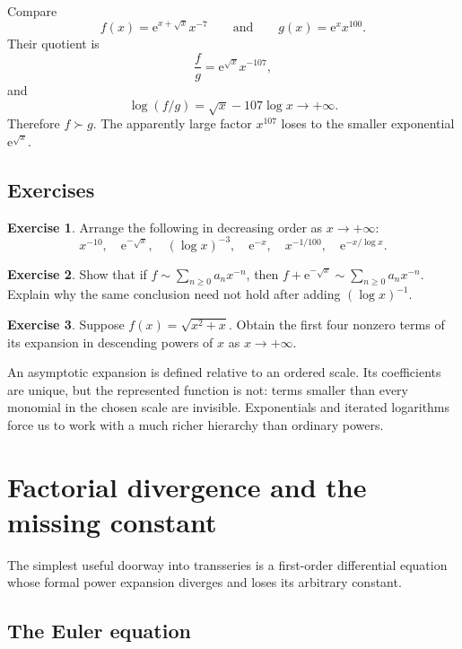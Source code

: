 \documentclass[11pt,openany]{book}
\theoremstyle{definition}
\newtheorem{exercise}{Exercise}[chapter]
\theoremstyle{plain}
\theoremstyle{remark}
\newcommand{\e}{\mathrm{e}}
\newcommand{\asym}{\sim}
\newcommand{\succdom}{\succ}
\begin{document}
\begin{workedbox}
Compare
\[
 f(x)=\e^{x+\sqrt{x}}x^{-7}
 \qquad\text{and}\qquad
 g(x)=\e^x x^{100}.
\]
Their quotient is
\[
 \frac fg=\e^{\sqrt{x}}x^{-107},
\]
and
\[
 \log(f/g)=\sqrt{x}-107\log x\longrightarrow+\infty.
\]
Therefore $f\succdom g$. The apparently large factor $x^{107}$ loses to the smaller exponential $\e^{\sqrt{x}}$.
\end{workedbox}

\section{Exercises}

\begin{exercise}
Arrange the following in decreasing order as $x\to+\infty$:
\[
 x^{-10},\quad \e^{-\sqrt{x}},\quad (\log x)^{-3},\quad
 \e^{-x},\quad x^{-1/100},\quad \e^{-x/\log x}.
\]
\end{exercise}

\begin{exercise}
Show that if $f\asym\sum_{n\ge0}a_nx^{-n}$, then
$f+\e^{-\sqrt{x}}\asym\sum_{n\ge0}a_nx^{-n}$.
Explain why the same conclusion need not hold after adding $(\log x)^{-1}$.
\end{exercise}

\begin{exercise}
Suppose $f(x)=\sqrt{x^2+x}$. Obtain the first four nonzero terms of its expansion in descending powers of $x$ as $x\to+\infty$.
\end{exercise}

\begin{summarybox}
An asymptotic expansion is defined relative to an ordered scale. Its coefficients are unique, but the represented function is not: terms smaller than every monomial in the chosen scale are invisible. Exponentials and iterated logarithms force us to work with a much richer hierarchy than ordinary powers.
\end{summarybox}


\chapter{Factorial divergence and the missing constant}\label{ch:euler}

The simplest useful doorway into transseries is a first-order differential equation whose formal power expansion diverges and loses its arbitrary constant.

\section{The Euler equation}
\end{document}
